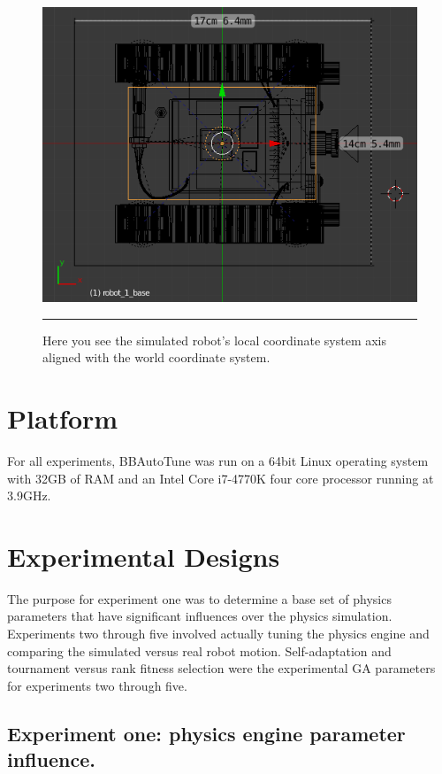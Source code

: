 \begin{figure}[htbp]
\centering
\includegraphics[scale=0.5]{../Figures/Chapter4/simu_robot_aligned.png}
\rule{35em}{0.5pt}
\caption[Simulated Robot Axis Aligned]{Here you see the simulated robot's local coordinate system axis aligned with the world coordinate system.}
\label{fig:simu_robot_aligned}
\end{figure}

\section{Platform}

For all experiments, BBAutoTune was run on a 64bit Linux operating system with 32GB of RAM and an Intel Core i7-4770K four core processor running at 3.9GHz.

\section{Experimental Designs}

The purpose for experiment one was to determine a base set of physics parameters that have significant influences over the physics simulation. Experiments two through five involved actually tuning the physics engine and comparing the simulated versus real robot motion. Self-adaptation and tournament versus rank fitness selection were the experimental GA parameters for experiments two through five. 

\subsection[Experiment One]{Experiment one: physics engine parameter influence.}

